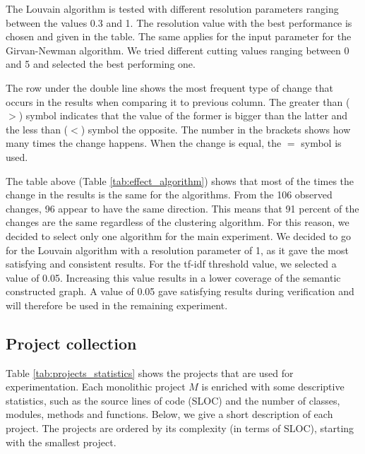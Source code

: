 The Louvain algorithm is tested with different resolution parameters ranging between the values 0.3 and 1. The resolution value with the best performance is chosen and given in the table. The same applies for the input parameter for the Girvan-Newman algorithm. We tried different cutting values ranging between 0 and 5 and selected the best performing one. \par
The row under the double line shows the most frequent type of change that occurs in the results when comparing it to previous column. The greater than ($>$) symbol indicates that the value of the former is bigger than the latter and the less than ($<$) symbol the opposite. The number in the brackets shows how many times the change happens. When the change is equal, the $=$ symbol is used. \par
The table above (Table \ref{tab:effect_algorithm}) shows that most of the times the change in the results is the same for the algorithms. From the 106 observed changes, 96 appear to have the same direction. This means that 91 percent of the changes are the same regardless of the clustering algorithm. For this reason, we decided to select only one algorithm for the main experiment. We decided to go for the Louvain algorithm with a resolution parameter of 1, as it gave the most satisfying and consistent results. For the tf-idf threshold value, we selected a value of 0.05. Increasing this value results in a lower coverage of the semantic constructed graph. A value of 0.05 gave satisfying results during verification and will therefore be used in the remaining experiment.

\subsection{Project collection}
Table \ref{tab:projects_statistics} shows the projects that are used for experimentation. Each monolithic project $M$ is enriched with some descriptive statistics, such as the source lines of code (SLOC) and the number of classes, modules, methods and functions. Below, we give a short description of each project. The projects are ordered by its complexity (in terms of SLOC), starting with the smallest project.

